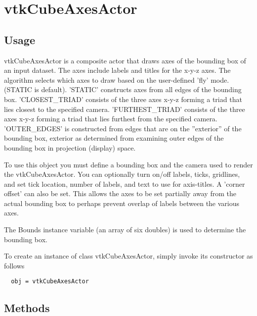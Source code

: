 \section{vtkCubeAxesActor}

\subsection{Usage}

 vtkCubeAxesActor is a composite actor that draws axes of the 
 bounding box of an input dataset. The axes include labels and titles
 for the x-y-z axes. The algorithm selects which axes to draw based
 on the user-defined 'fly' mode.  (STATIC is default).
 'STATIC' constructs axes from all edges of the bounding box.
 'CLOSEST\_TRIAD' consists of the three axes x-y-z forming a triad that 
 lies closest to the specified camera. 
 'FURTHEST\_TRIAD' consists of the three axes x-y-z forming a triad that 
 lies furthest from the specified camera. 
 'OUTER\_EDGES' is constructed from edges that are on the ''exterior'' of the 
 bounding box, exterior as determined from examining outer edges of the 
 bounding box in projection (display) space. 
 
 To use this object you must define a bounding box and the camera used
 to render the vtkCubeAxesActor. You can optionally turn on/off labels,
 ticks, gridlines, and set tick location, number of labels, and text to
 use for axis-titles.  A 'corner offset' can also be set.  This allows 
 the axes to be set partially away from the actual bounding box to perhaps
 prevent overlap of labels between the various axes.

 The Bounds instance variable (an array of six doubles) is used to determine
 the bounding box.
 

To create an instance of class vtkCubeAxesActor, simply
invoke its constructor as follows
\begin{verbatim}
  obj = vtkCubeAxesActor
\end{verbatim}
\subsection{Methods}

